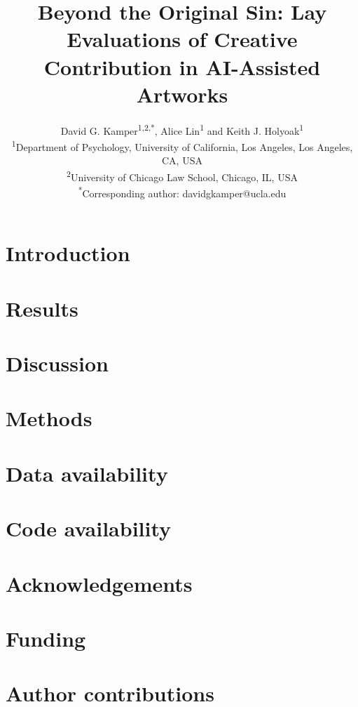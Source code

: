 \documentclass[11pt,a4paper]{article}
\title{Beyond the Original Sin: Lay Evaluations of Creative Contribution in AI-Assisted Artworks}
\author{David G. Kamper\textsuperscript{1,2,*}, Alice Lin\textsuperscript{1} and Keith J. Holyoak\textsuperscript{1}\\[1ex]
  \small\textsuperscript{1}Department of Psychology, University of California, Los Angeles, Los Angeles, CA, USA\\
  \small\textsuperscript{2}University of Chicago Law School, Chicago, IL, USA\\
  \small\textsuperscript{*}Corresponding author: davidgkamper@ucla.edu}
\date{}
\begin{document}
\maketitle

\begin{abstract}

\end{abstract}

\section*{Introduction}


\section*{Results}


\section*{Discussion}


\section*{Methods}


\section*{Data availability}


\section*{Code availability}





\section*{Acknowledgements}


\section*{Funding}


\section*{Author contributions}

\end{document}
